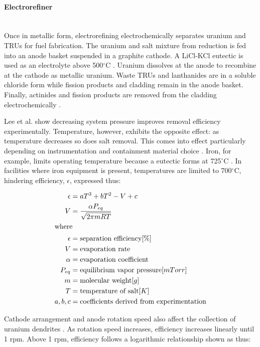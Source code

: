 \paragraph{Electrorefiner} \mbox{}\\
Once in metallic form, electrorefining electrochemically separates uranium and TRUs for fuel fabrication.
The uranium and salt mixture from reduction is fed into an anode basket suspended in a graphite cathode. 
A LiCl-KCl eutectic is used as an electrolyte above 500$^{\circ}$C \cite{flowsheet_1998,lee_korean_2011}. 
Uranium dissolves at the anode to recombine at the cathode as metallic uranium.
Waste TRUs and lanthanides are in a soluble chloride form  while fission products and cladding remain in the anode
basket. Finally, actinides and fission products are removed from the cladding electrochemically \cite{lee_korean_2011}.

Lee et al. \cite{lee_advanced_2008} show decreasing system pressure improves removal efficiency experimentally.
Temperature, however, exhibits the opposite effect: as temperature decreases so does salt removal. This comes into effect 
particularly depending on instrumentation and containment material choice \cite{lee_advanced_2008}. 
Iron, for example, limits operating temperature because a eutectic forms at 725$^{\circ}$C \cite{chapman_revision_1984}.
In facilities where iron equipment is present, temperatures are limited to 700$^{\circ}$C, hindering efficiency, $\epsilon$, expressed thus:

\begin{align}
\epsilon &= aT^3 + bT^2 - V + c \\
V &= \frac{\alpha P_{eq}}{\sqrt{2\pi mRT}} \\
\intertext{where}
\epsilon &= \mbox{separation efficiency} [\%] \nonumber \\
V &= \mbox{evaporation rate} \nonumber \\
\alpha &= \mbox{evaporation coefficient} \nonumber \\
P_{eq} &= \mbox{equilibrium vapor pressure} [mTorr] \nonumber \\
m &= \mbox{molecular weight} [g] \nonumber \\
T &= \mbox{temperature of salt} [K] \nonumber \\
a,b,c &= \mbox{coefficients derived from experimentation} \nonumber
\end{align}

Cathode arrangement and anode rotation speed also affect the collection of uranium 
dendrites \cite{lee_advanced_2008}. As rotation speed increases, efficiency increases linearly until 1 rpm. Above 1 rpm, efficiency follows a logarithmic relationship shown as thus:

